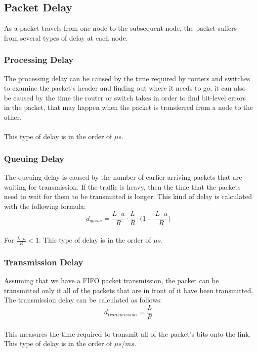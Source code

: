 \documentclass{article}
\begin{document}
\subsection{Packet Delay}
As a packet travels from one node to the subsequent node, the packet suffers from several types of delay at each node.

\subsubsection{Processing Delay}
The processing delay can be caused by the time required by routers and switches to examine the packet's header and finding out where it needs to go; it can also be caused by the time the router or switch takes in order to find bit-level errors in the packet, that may happen when the packet is transferred from a node to the other. \\ \\
This type of delay is in the order of $\mu s$.

\subsubsection{Queuing Delay}
The queuing delay is caused by the number of earlier-arriving packets that are waiting for transmission. If the traffic is heavy, then the time that the packets need to wait for them to be transmitted is longer. This kind of delay is calculated with the following formula: \\

	\[ d_{queue} = \frac{L \cdot a}{R} \cdot \frac{L}{R} \cdot \Big(1 - \frac{L \cdot a}{R}\Big) \] \\
	
\noindent For $\displaystyle \frac{L \cdot a}{R} < 1$. This type of delay is in the order of $\mu s$.

\subsubsection{Transmission Delay}
Assuming that we have a FIFO packet transmission, the packet can be transmitted only if all of the packets that are in front of it have been transmitted. The transmission delay can be calculated as follows: \\

	\[ d_{transmission} = \frac{L}{R} \] \\
	
\noindent This measures the time required to transmit all of the packet's bits onto the link. This type of delay is in the order of $\mu s / ms$.
\end{document}
